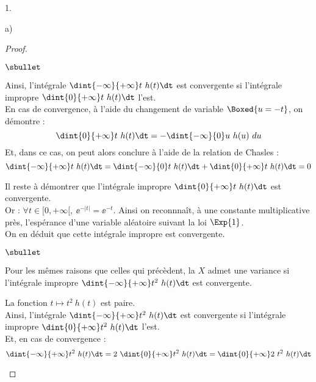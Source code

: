 \documentclass[11pt]{article}%
\begin{document}
\begin{noliste}{1.}
\begin{noliste}{a)}
\begin{proof}
\begin{noliste}{$\sbullet$}
      \item Ainsi, l'intégrale $\dint{-\infty}{+\infty} t \ h(t) \dt$
        est convergente si l'intégrale impropre $\dint{0}{+\infty} t \
        h(t) \dt$ l'est. \\[.2cm]
        En cas de convergence, à l'aide du changement de variable
        $\Boxed{u = -t}$, on démontre :
        \[
        \dint{0}{+\infty} t \ h(t) \dt = - \dint{-\infty}{0} u \ h(u)
        \ du 
        \]
        Et, dans ce cas, on peut alors conclure à l'aide de la
        relation de Chasles :
        \[
        \dint{-\infty}{+\infty} t \ h(t) \dt = \dint{-\infty}{0} t \
        h(t) \dt + \dint{0}{+\infty} t \ h(t) \dt = 0
        \]

      \item Il reste à démontrer que l'intégrale impropre
        $\dint{0}{+\infty} t \ h(t) \dt$ est convergente.\\[.2cm]
        Or : $\forall t \in [0, +\infty[, \ \ee^{-|t|} =
        \ee^{-t}$. Ainsi on reconnnaît, à une constante multiplicative
        près, l'espérance d'une variable aléatoire suivant la loi
        $\Exp{1}$.\\
        On en déduit que cette intégrale impropre est convergente.
      \end{noliste}
        
        
        
        
        
        
      \begin{noliste}{$\sbullet$}
      \item Pour les mêmes raisons que celles qui précèdent, la \var
        $X$ admet une variance si l'intégrale impropre
        $\dint{-\infty}{+\infty} t^2 \ h(t) \dt$ est convergente.

      \item La fonction $t \mapsto t^2 \ h(t)$ est paire.\\[.2cm]
        Ainsi, l'intégrale $\dint{-\infty}{+\infty} t^2 \ h(t) \dt$
        est convergente si l'intégrale impropre $\dint{0}{+\infty} t^2
        \ h(t) \dt$ l'est.\\[.2cm]
        Et, en cas de convergence :
        \[
        \dint{-\infty}{+\infty} t^2 \ h(t) \dt = 2 \ \dint{0}{+\infty}
        t^2 \ h(t) \dt = \dint{0}{+\infty} 2 \ t^2 \ h(t) \dt
        \]


\end{noliste}
\end{proof}
\end{noliste}
\end{noliste}
\end{document}
